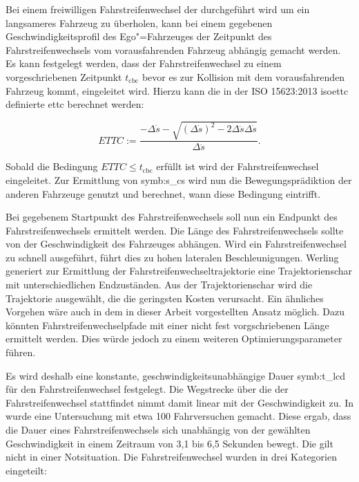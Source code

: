 Bei einem freiwilligen Fahrstreifenwechsel der durchgef\"uhrt wird um ein langsameres Fahrzeug zu \"uberholen, kann bei einem gegebenen Geschwindigkeitsprofil des Ego"=Fahrzeuges der Zeitpunkt des Fahrstreifenwechsels vom vorausfahrenden Fahrzeug abh\"angig gemacht werden.
Es kann festgelegt werden, dass der Fahrstreifenwechsel zu einem vorgeschriebenen Zeitpunkt \(t_\mathrm{cbc} \) bevor es zur Kollision mit dem vorausfahrenden Fahrzeug kommt, eingeleitet wird.
Hierzu kann die in der ISO 15623:2013 \gls{isoettc} definierte \gls{ettc} berechnet werden:

\begin{equation} 
	ETTC := \frac{- \Delta \dot{s} - \sqrt{\left( \Delta \dot{s} \right)^2 - 2 \Delta \ddot{s} \Delta \dot{s}}}{\Delta \ddot{s}}.
\end{equation}

Sobald die Bedingung \(ETTC \leq t_\mathrm{cbc}\) erf\"ullt ist wird der Fahrstreifenwechsel eingeleitet.
Zur Ermittlung von \gls{symb:s_cs} wird nun die Bewegungspr\"adiktion der anderen Fahrzeuge genutzt und berechnet, wann diese Bedingung eintrifft.

Bei gegebenem Startpunkt des Fahrstreifenwechsels soll nun ein Endpunkt des Fahrstreifenwechsels ermittelt werden.
Die L\"ange des Fahrstreifenwechsels sollte von der Geschwindigkeit des Fahrzeuges abh\"angen.
Wird ein Fahrstreifenwechsel zu schnell ausgef\"uhrt, f\"uhrt dies zu hohen lateralen Beschleunigungen.
Werling \cite{Werling2011} generiert zur Ermittlung der Fahrstreifenwechseltrajektorie eine Trajektorienschar mit unterschiedlichen Endzust\"anden.
Aus der Trajektorienschar wird die Trajektorie ausgew\"ahlt, die die geringsten Kosten verursacht.
Ein \"ahnliches Vorgehen w\"are auch in dem in dieser Arbeit vorgestellten Ansatz m\"oglich.
Dazu k\"onnten Fahrstreifenwechselpfade mit einer nicht fest vorgschriebenen L\"ange ermittelt werden.
Dies w\"urde jedoch zu einem weiteren Optimierungsparameter f\"uhren.

Es wird deshalb eine konstante, geschwindigkeitsunabh\"angige Dauer \gls{symb:t_lcd} f\"ur den Fahrstreifenwechsel festgelegt.
Die Wegstrecke \"uber die der Fahrstreifenwechsel stattfindet nimmt damit linear mit der Geschwindigkeit zu.
In \cite{Sporrer1998} wurde eine Untersuchung mit etwa 100 Fahrversuchen gemacht.
Diese ergab, dass die Dauer eines Fahrstreifenwechsels sich unabh\"angig von der gew\"ahlten Geschwindigkeit in einem Zeitraum von 3,1 bis 6,5 Sekunden bewegt.
Die gilt nicht in einer Notsituation.
Die Fahrstreifenwechsel wurden in drei Kategorien eingeteilt:


